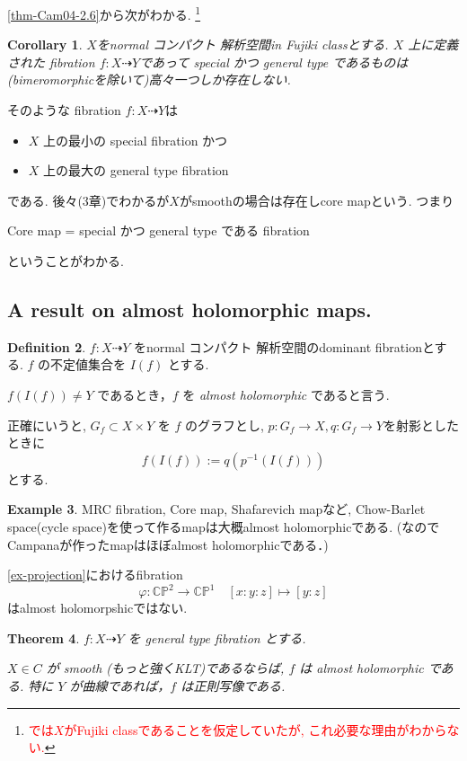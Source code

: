 \documentclass[dvipdfmx,a4paper,11pt]{article} %
\newtheorem{thm}{Theorem}[section]
\newtheorem{cor}[thm]{Corollary}
\theoremstyle{definition}
\newtheorem{defn}[thm]{Definition}
\newtheorem{ex}[thm]{Example}
\theoremstyle{remark}
\numberwithin{equation}{section}
\newcommand{\C}{\mathbb{C}}
\newcommand{\xr}[1]{\textcolor{red}{#1}}
\begin{document}
\ref{thm-Cam04-2.6}から次がわかる. \footnote{\xr{\cite[Corollary 2.20]{Cam04}では$X$がFujiki classであることを仮定していたが, これ必要な理由がわからない.}}
\begin{cor}\cite[Corollary 2.20]{Cam04}
\label{cor-Cam04-2.20}
$X$をnormal コンパクト 解析空間in Fujiki classとする. 
\(X\) 上に定義された fibration $f : X \dashrightarrow Y$であって special かつ general type であるものは(bimeromorphicを除いて)高々一つしか存在しない. 
\end{cor}

そのような fibration $f : X \dashrightarrow Y$は 
\begin{itemize}
\item \(X\) 上の最小の special fibration かつ
\item\(X\) 上の最大の general type fibration 
\end{itemize}
である. 後々(3章)でわかるが$X$がsmoothの場合は存在しcore mapという. つまり
\begin{center}
Core map =  special かつ general type である fibration
\end{center}
ということがわかる. 

\subsection{A result on almost holomorphic maps. \cite[2.5]{Cam04}}

\begin{defn}\cite[Definition 2.21]{Cam04}
\(f : X \dashrightarrow Y\) をnormal コンパクト 解析空間のdominant fibrationとする.
 \(f\) の不定値集合を \(I(f)\) とする. 
 
 \(f( I(f) )  \neq Y\) であるとき，\(f\) を \emph{almost holomorphic} であると言う.
\end{defn}
正確にいうと, \(G_{f}\subset X\times Y\) を \(f\) のグラフとし, $p : G_f \to X, q : G_f \to Y$を射影としたときに
\[
f( I(f) ) := q(p^{-1}(I(f)))
\]
とする. 

\begin{ex}
MRC fibration, Core map, Shafarevich mapなど, Chow-Barlet space(cycle space)を使って作るmapは大概almost holomorphicである. (なのでCampanaが作ったmapはほぼalmost holomorphicである．)

\ref{ex-projection}におけるfibration
$$
\varphi : \C\mathbb{P}^2 \to \C\mathbb{P}^1 
\quad
[x:y:z] \mapsto [y:z] 
$$
はalmost holomorpshicではない. 
\end{ex}

\begin{thm}\cite[Theorem 2.22]{Cam04}
\(f : X \dashrightarrow Y\) を general type fibration とする. 

\(X\in C\) が smooth (もっと強くKLT)であるならば,  \(f\) は almost holomorphic である.
特に \(Y\) が曲線であれば，\(f\) は正則写像である.
\end{thm}
\end{document}
